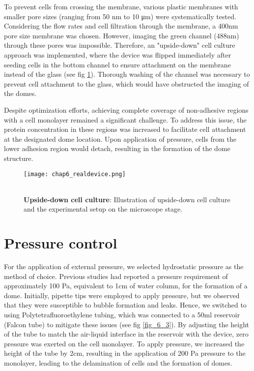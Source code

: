 \clearpage

To prevent cells from crossing the membrane, various plastic membranes with smaller pore sizes (ranging from 50 \unit{\nm} to 10 \unit{\um}) were systematically tested. Considering the flow rates and cell filtration through the membrane, a 400\unit{\nm} pore size membrane was chosen. However, imaging the green channel (488\unit{\nm}) through these pores was impossible. Therefore, an "upside-down" cell culture approach was implemented, where the device was flipped immediately after seeding cells in the bottom channel to ensure attachment on the membrane instead of the glass (see fig \ref{fig_6_5}). Thorough washing of the channel was necessary to prevent cell attachment to the glass, which would have obstructed the imaging of the domes.

Despite optimization efforts, achieving complete coverage of non-adhesive regions with a cell monolayer remained a significant challenge. To address this issue, the protein concentration in these regions was increased to facilitate cell attachment at the designated dome location. Upon application of pressure, cells from the lower adhesion region would detach, resulting in the formation of the dome structure.

\begin{figure}
	\begin{minipage}[c]{0.7\textwidth}
		\texttt{[image: chap6\_realdevice.png]}
	\end{minipage}\hfill
	\begin{minipage}[c]{0.27\textwidth}
		\caption{\\ \textbf{Upside-down cell culture}: Illustration of upside-down cell culture and the experimental setup on the microscope stage.
		}\label{fig_6_5}
	\end{minipage}
\end{figure}

\hypertarget{pressure-control}{%
\section{Pressure control}\label{pressure-control}}

For the application of external pressure, we selected hydrostatic pressure as the method of choice. Previous studies had reported a pressure requirement of approximately 100 \unit{\pascal}, equivalent to 1\unit{\cm} of water column, for the formation of a dome. Initially, pipette tips were employed to apply pressure, but we observed that they were susceptible to bubble formation and leaks. Hence, we switched to using Polytetrafluoroethylene tubing, which was connected to a 50\unit{\ml} reservoir (Falcon tube) to mitigate these issues (see fig \ref{fig_6_3}). By adjusting the height of the tube to match the air-liquid interface in the reservoir with the device, zero pressure was exerted on the cell monolayer. To apply pressure, we increased the height of the tube by 2\unit{\cm}, resulting in the application of 200 \unit{\pascal} pressure to the monolayer, leading to the delamination of cells and the formation of domes.

